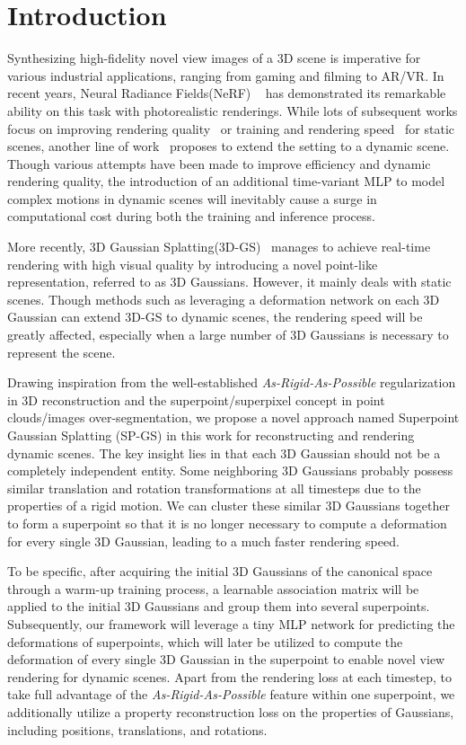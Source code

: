 \section{Introduction}
\label{sec:intro}

Synthesizing high-fidelity novel view images of a 3D scene is imperative for various industrial applications, ranging from gaming and filming to AR/VR. In recent years, Neural Radiance Fields(NeRF) ~\cite{NeRF} has demonstrated its remarkable ability on this task with photorealistic renderings. While lots of subsequent works focus on improving rendering quality~\cite{Mip-NeRF, Mip-NeRF360} or training and rendering speed~\cite{Instant-NGP, TensoRF, EfficientNeRF, Plenoxels} for static scenes, another line of work~\cite{D-NeRF, KPlanes, TiNeuVox} proposes to extend the setting to a dynamic scene. Though various attempts have been made to improve efficiency and dynamic rendering quality, the introduction of an additional time-variant MLP to model complex motions in dynamic scenes will inevitably cause a surge in computational cost during both the training and inference process.

More recently, 3D Gaussian Splatting(3D-GS)~\cite{3D-GS} manages to achieve real-time rendering with high visual quality by introducing a novel point-like representation, referred to as 3D Gaussians. However, it mainly deals with static scenes. Though methods such as leveraging a deformation network on each 3D Gaussian can extend 3D-GS to dynamic scenes, the rendering speed will be greatly affected, especially when a large number of 3D Gaussians is necessary to represent the scene.

Drawing inspiration from the well-established \textit{As-Rigid-As-Possible} regularization in 3D reconstruction and the superpoint/superpixel concept in point clouds/images over-segmentation, we propose a novel approach named Superpoint Gaussian Splatting (SP-GS) in this work for reconstructing and rendering dynamic scenes. 
The key insight lies in that each 3D Gaussian should not be a completely independent entity. Some neighboring 3D Gaussians probably possess similar translation and rotation transformations at all timesteps due to the properties of a rigid motion. We can cluster these similar 3D Gaussians together to form a superpoint so that it is no longer necessary to compute a deformation for every single 3D Gaussian, leading to a much faster rendering speed.

To be specific, after acquiring the initial 3D Gaussians of the canonical space through a warm-up training process, a learnable association matrix will be applied to the initial 3D Gaussians and group them into several superpoints. Subsequently, our framework will leverage a tiny MLP network for predicting the deformations of superpoints, which will later be utilized to compute the deformation of every single 3D Gaussian in the superpoint to enable novel view rendering for dynamic scenes. Apart from the rendering loss at each timestep, to take full advantage of the 
 \textit{As-Rigid-As-Possible} feature within one superpoint, we additionally utilize a property reconstruction loss on the properties of Gaussians, including positions, translations, and rotations. 

